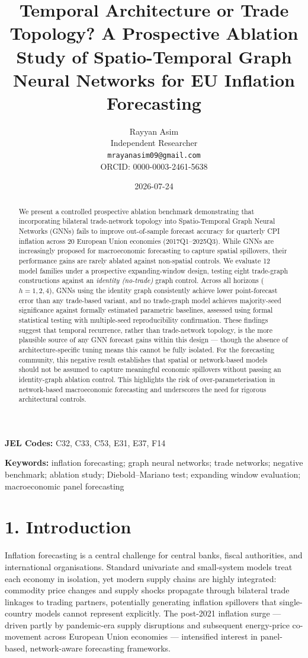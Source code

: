 \documentclass[
]{article}
\title{Temporal Architecture or Trade Topology? A Prospective Ablation Study of Spatio-Temporal Graph Neural Networks for EU Inflation Forecasting}
\author{Rayyan Asim \\ Independent Researcher \\ \texttt{mrayanasim09@gmail.com} \\ ORCID: 0000-0003-2461-5638}
\date{2026-07-24}
\begin{document}
\maketitle
\begin{abstract}
We present a controlled prospective ablation benchmark demonstrating that incorporating bilateral trade-network topology into Spatio-Temporal Graph Neural Networks (GNNs) fails to improve out-of-sample forecast accuracy for quarterly CPI inflation across 20 European Union economies (2017Q1--2025Q3). While GNNs are increasingly proposed for macroeconomic forecasting to capture spatial spillovers, their performance gains are rarely ablated against non-spatial controls. We evaluate 12 model families under a prospective expanding-window design, testing eight trade-graph constructions against an \emph{identity (no-trade)} graph control. Across all horizons ($h=1,2,4$), GNNs using the identity graph consistently achieve lower point-forecast error than any trade-based variant, and no trade-graph model achieves majority-seed significance against formally estimated parametric baselines, assessed using formal statistical testing with multiple-seed reproducibility confirmation. These findings suggest that temporal recurrence, rather than trade-network topology, is the more plausible source of any GNN forecast gains within this design --- though the absence of architecture-specific tuning means this cannot be fully isolated. For the forecasting community, this negative result establishes that spatial or network-based models should not be assumed to capture meaningful economic spillovers without passing an identity-graph ablation control. This highlights the risk of over-parameterisation in network-based macroeconomic forecasting and underscores the need for rigorous architectural controls.
\end{abstract}

\noindent\textbf{JEL Codes:} C32, C33, C53, E31, E37, F14

\noindent\textbf{Keywords:} inflation forecasting; graph neural networks; trade networks; negative benchmark; ablation study; Diebold--Mariano test; expanding window evaluation; macroeconomic panel forecasting

\section{1. Introduction}\label{introduction}

Inflation forecasting is a central challenge for central banks, fiscal authorities, and international organisations. Standard univariate and small-system models treat each economy in isolation, yet modern supply chains are highly integrated: commodity price changes and supply shocks propagate through bilateral trade linkages to trading partners, potentially generating inflation spillovers that single-country models cannot represent explicitly. The post-2021 inflation surge — driven partly by pandemic-era supply disruptions and subsequent energy-price co-movement across European Union economies — intensified interest in panel-based, network-aware forecasting frameworks.
\end{document}
